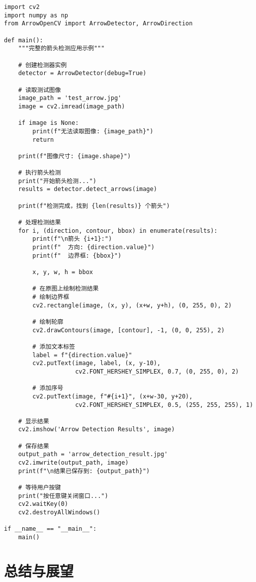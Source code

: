 \documentclass[12pt]{article}
\begin{document}
\begin{lstlisting}[caption=完整的系统使用示例]
import cv2
import numpy as np
from ArrowOpenCV import ArrowDetector, ArrowDirection

def main():
    """完整的箭头检测应用示例"""
    
    # 创建检测器实例
    detector = ArrowDetector(debug=True)
    
    # 读取测试图像
    image_path = 'test_arrow.jpg'
    image = cv2.imread(image_path)
    
    if image is None:
        print(f"无法读取图像: {image_path}")
        return
    
    print(f"图像尺寸: {image.shape}")
    
    # 执行箭头检测
    print("开始箭头检测...")
    results = detector.detect_arrows(image)
    
    print(f"检测完成，找到 {len(results)} 个箭头")
    
    # 处理检测结果
    for i, (direction, contour, bbox) in enumerate(results):
        print(f"\n箭头 {i+1}:")
        print(f"  方向: {direction.value}")
        print(f"  边界框: {bbox}")
        
        x, y, w, h = bbox
        
        # 在原图上绘制检测结果
        # 绘制边界框
        cv2.rectangle(image, (x, y), (x+w, y+h), (0, 255, 0), 2)
        
        # 绘制轮廓
        cv2.drawContours(image, [contour], -1, (0, 0, 255), 2)
        
        # 添加文本标签
        label = f"{direction.value}"
        cv2.putText(image, label, (x, y-10), 
                    cv2.FONT_HERSHEY_SIMPLEX, 0.7, (0, 255, 0), 2)
        
        # 添加序号
        cv2.putText(image, f"#{i+1}", (x+w-30, y+20), 
                    cv2.FONT_HERSHEY_SIMPLEX, 0.5, (255, 255, 255), 1)
    
    # 显示结果
    cv2.imshow('Arrow Detection Results', image)
    
    # 保存结果
    output_path = 'arrow_detection_result.jpg'
    cv2.imwrite(output_path, image)
    print(f"\n结果已保存到: {output_path}")
    
    # 等待用户按键
    print("按任意键关闭窗口...")
    cv2.waitKey(0)
    cv2.destroyAllWindows()

if __name__ == "__main__":
    main()
\end{lstlisting}

\section{总结与展望}
\end{document}
